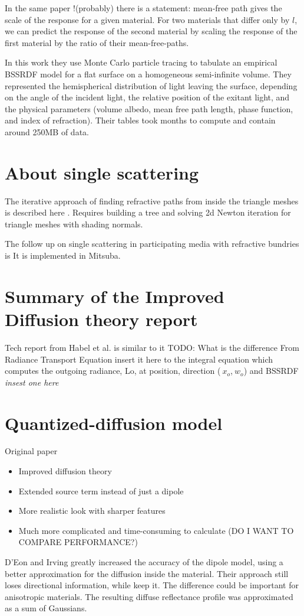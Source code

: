 In the same paper !(probably) there is a statement:
mean-free path gives the scale of the response for a given material. For two
materials that differ only by $l$, we can predict the response of the second
material by scaling the response of the first material by the ratio of their
mean-free-paths.

In this work they use Monte Carlo particle tracing to tabulate an empirical
BSSRDF model for a flat surface on a homogeneous semi-infinite volume.
They represented the hemispherical distribution of light leaving the surface,
depending on the angle of the incident light, the relative position of the
exitant light, and the physical parameters (volume albedo, mean free path
length, phase function, and index of refraction). Their tables took months to
compute and contain around 250MB of data.

\section{About single scattering}
The iterative approach of finding refractive paths from inside the triangle
meshes is described here \cite{walter:inria-00388481}. Requires building a tree
and solving 2d Newton iteration for triangle meshes with shading normals.

The follow up on single scattering in participating media with refractive
bundries is \cite{holzschuch:hal-01083246} It is implemented in Mitsuba.

\section{Summary of the Improved Diffusion theory report}
Tech report from Habel et al. \cite{habel13cid} is similar to
it \cite{Habel:2013:PBD:2600890.2600896} TODO: What is the difference
From Radiance Transport Equation {insert it here} to the integral equation which
computes the outgoing radiance, Lo, at position, direction ($~x_o$,$~w_o$) and
BSSRDF \textit{insest one here}


\section{Quantized-diffusion model}
Original paper \cite{D'Eon:2011:QMR:1964921.1964951}
\begin{itemize}
    \item Improved diffusion theory
    \item Extended source term instead of just a dipole
    \item More realistic look with sharper features
    \item Much more complicated and time-consuming to calculate (DO I WANT TO COMPARE PERFORMANCE?)
\end{itemize}
D’Eon and Irving  greatly increased the accuracy of the dipole model, using a
better approximation for the diffusion inside the material. Their approach still
loses directional information, while \cite{holzschuch:hal-00760054} keep it. The
difference could be important for anisotropic materials.
The resulting diffuse reflectance profile was approximated as a sum of Gaussians.

